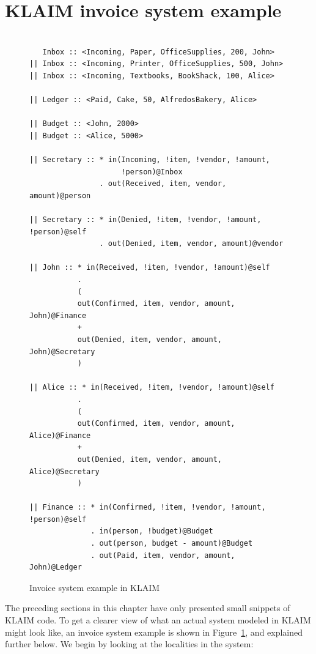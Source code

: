 \section{KLAIM invoice system example}
\begin{figure}
\label{fig:invoice_system}
\caption{Invoice system example in KLAIM}
\lstset{showtabs=false,showspaces=false,showstringspaces=false}
\begin{lstlisting}[frame=trbl,language=klaim,basicstyle=\footnotesize\ttfamily,showtabs=false,showspaces=false]
  
   Inbox :: <Incoming, Paper, OfficeSupplies, 200, John>
|| Inbox :: <Incoming, Printer, OfficeSupplies, 500, John>  
|| Inbox :: <Incoming, Textbooks, BookShack, 100, Alice>  

|| Ledger :: <Paid, Cake, 50, AlfredosBakery, Alice>

|| Budget :: <John, 2000>
|| Budget :: <Alice, 5000>
  
|| Secretary :: * in(Incoming, !item, !vendor, !amount,  
                     !person)@Inbox 
                . out(Received, item, vendor, amount)@person

|| Secretary :: * in(Denied, !item, !vendor, !amount, !person)@self 
                . out(Denied, item, vendor, amount)@vendor

|| John :: * in(Received, !item, !vendor, !amount)@self
           . 
           (
           out(Confirmed, item, vendor, amount, John)@Finance
           +
           out(Denied, item, vendor, amount, John)@Secretary
           )

|| Alice :: * in(Received, !item, !vendor, !amount)@self
           . 
           (
           out(Confirmed, item, vendor, amount, Alice)@Finance
           +
           out(Denied, item, vendor, amount, Alice)@Secretary
           )

|| Finance :: * in(Confirmed, !item, !vendor, !amount, !person)@self
              . in(person, !budget)@Budget 
              . out(person, budget - amount)@Budget
              . out(Paid, item, vendor, amount, John)@Ledger
	\end{lstlisting}           
  \end{figure}

	The preceding sections in this chapter have only presented small snippets of 
	KLAIM code. To get a clearer view of what an actual system modeled in KLAIM 
	might look like, an invoice system example is shown in 
	Figure~\ref{fig:invoice_system}, and explained further below.
	We begin by looking at the localities in the system:
	
